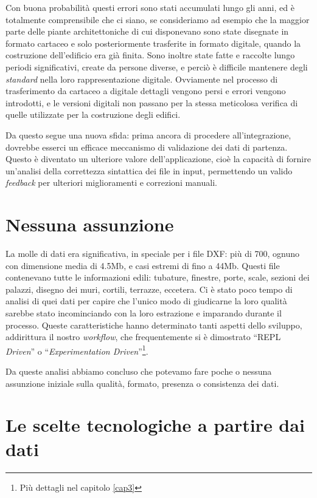 \documentclass[12pt]{report}
\begin{document}
Con buona probabilità questi errori sono stati accumulati lungo gli
anni, ed è totalmente comprensibile che ci siano, se  consideriamo ad
esempio che la maggior parte delle piante architettoniche di cui
disponevano sono state disegnate in formato cartaceo e solo posteriormente
trasferite in formato digitale, quando la costruzione dell'edificio era già
finita. Sono inoltre state fatte e raccolte lungo periodi significativi,
create da persone diverse, e perciò è difficile mantenere degli
\textit{standard} nella loro rappresentazione digitale. Ovviamente nel
processo di trasferimento da cartaceo a digitale dettagli vengono persi e
errori vengono introdotti, e le versioni digitali non passano per la stessa
meticolosa verifica di quelle utilizzate per la costruzione degli edifici. 

Da questo segue una nuova sfida: prima ancora di procedere all'integrazione,
dovrebbe esserci un efficace meccanismo di validazione dei dati di partenza.
Questo è diventato un ulteriore valore dell'applicazione, cioè la capacità di
fornire un'analisi della correttezza sintattica dei file in input, permettendo
un valido \textit{feedback} per ulteriori miglioramenti e correzioni manuali.

\section*{Nessuna assunzione}

La molle di dati era significativa, in speciale per i file DXF: più di
700, ognuno con dimensione media di 4.5Mb, e casi estremi di fino a
44Mb. Questi file contenevano tutte le informazioni edili: tubature,
finestre, porte, scale, sezioni dei palazzi, disegno dei muri,
cortili, terrazze, eccetera. Ci è stato poco tempo di analisi di quei
dati per capire che l'unico modo di giudicarne la loro qualità sarebbe
stato incominciando con la loro estrazione e imparando durante il
processo. Queste caratteristiche hanno determinato tanti aspetti dello
sviluppo, addirittura il nostro \textit{workflow}, che frequentemente si è
dimostrato ``REPL \textit{Driven}'' o ``\textit{Experimentation
Driven}''\footnote{Più dettagli nel capitolo \ref{cap3}}. 

Da queste analisi abbiamo concluso che potevamo fare poche o nessuna
assunzione iniziale sulla qualità, formato, presenza o consistenza dei dati.

\section{Le scelte tecnologiche a partire dai dati}
\end{document}
